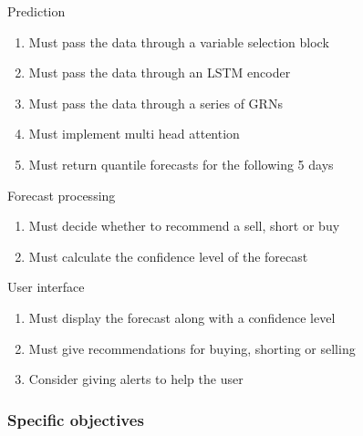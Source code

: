 \documentclass{article}
\begin{document}
\begin{figure}[h!]
Prediction
\begin{enumerate}
    \item Must pass the data through a variable selection block
    \item Must pass the data through an LSTM encoder
    \item Must pass the data through a series of GRNs
    \item Must implement multi head attention
    \item Must return quantile forecasts for the following 5 days
\end{enumerate}

Forecast processing
\begin{enumerate}
    \item Must decide whether to recommend a sell, short or buy
    \item  Must calculate the confidence level of the forecast
\end{enumerate}

User interface
\begin{enumerate}
    \item Must display the forecast along with a confidence level
    \item Must give recommendations for buying, shorting or selling
    \item Consider giving alerts to help the user
\end{enumerate}

\subsubsection{Specific objectives}


\end{figure}
\end{document}
